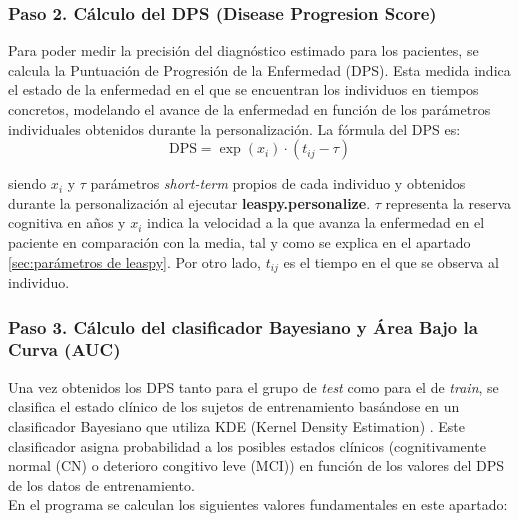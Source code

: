 \subsubsection{Paso 2. Cálculo del DPS (Disease Progresion Score)}
Para poder medir la precisión del diagnóstico estimado para los pacientes, se calcula la Puntuación de Progresión de la Enfermedad (DPS). Esta medida indica el estado de la enfermedad en el que se encuentran los individuos en tiempos concretos, modelando el avance de la enfermedad en función de los parámetros individuales obtenidos durante la personalización. La fórmula del DPS es:\\

\begin{equation}
	\text{DPS} = \exp(x_{i}) \cdot (t_{ij} - \tau)
\end{equation}

siendo $x_{i}$ y $\tau$ parámetros \textit{short-term} propios de cada individuo y obtenidos durante la personalización al ejecutar \textbf{leaspy.personalize}. $\tau$ representa la reserva cognitiva en años y $x_{i}$ indica la velocidad a la que avanza la enfermedad en el paciente en comparación con la media, tal y como se explica en el apartado \ref{sec:parámetros de leaspy}. Por otro lado, $t_{ij}$ es el tiempo en el que se observa al individuo.\\

\subsubsection{Paso 3. Cálculo del clasificador Bayesiano y Área Bajo la Curva (AUC)}
Una vez obtenidos los DPS tanto para el grupo de \textit{test} como para el de \textit{train}, se clasifica el estado clínico de los sujetos de entrenamiento basándose en un clasificador Bayesiano que utiliza KDE (Kernel Density Estimation) \cite{content94:online}.  Este clasificador asigna probabilidad a los posibles estados clínicos (cognitivamente normal (CN) o deterioro congitivo leve (MCI)) en función de los valores del DPS de los datos de entrenamiento.\\



En el programa se calculan los siguientes valores fundamentales en este apartado:

